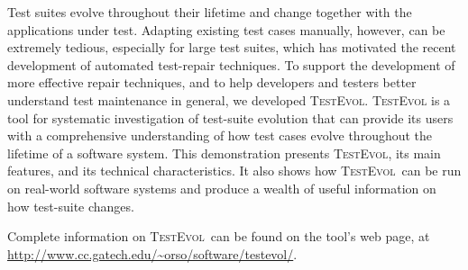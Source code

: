 \documentclass[conference]{IEEEtran}
\newcommand{\tool}{\textsc{TestEvol}\xspace}
\begin{document}
Test suites evolve throughout their lifetime and change together with
the applications under test. Adapting existing test cases manually,
however, can be extremely tedious, especially for large test suites,
which has motivated the recent development of automated test-repair
techniques. To support the development of more effective repair
techniques, and to help developers and testers better understand test
maintenance in general, we developed \tool. \tool is a tool for
systematic investigation of test-suite evolution that can provide its
users with a comprehensive understanding of how test cases evolve
throughout the lifetime of a software system. This demonstration
presents \tool, its main features, and its technical characteristics.
It also shows how \tool\ can be run on real-world software systems and
produce a wealth of useful information on how test-suite changes.

Complete information on \tool\ can be found on the tool's web page, at
{\small \url{http://www.cc.gatech.edu/~orso/software/testevol/}}.


\end{document}
